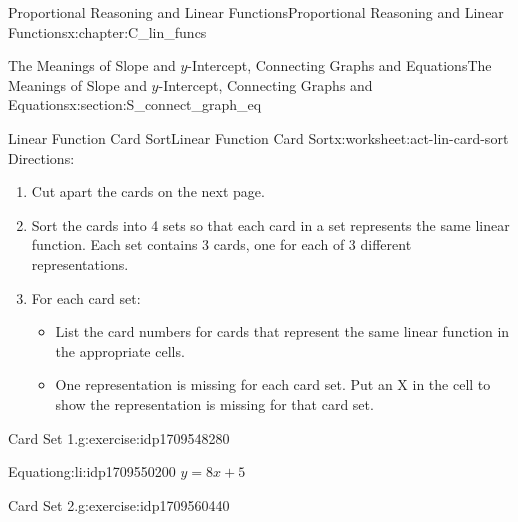 \documentclass[oneside,10pt,]{book}
\newlength{\fillinmaxwidth}
\newlength{\fillincontract}
\newlength{\fillinheight}
\newcommand{\fillintext}[1]{%
\setlength{\fillinmaxwidth}{#1em*\real{0.5}}%
\setlength{\fillincontract}{#1em*\real{0.5}*\real{0.2}}%
\setlength{\fillinheight}{\heightof{\strut}+1.2pt}%
\strut\nobreak\leaders\vbox{\hrule width 0.3pt height 0.3pt \vskip -1.2pt}\hskip 1\fillinmaxwidth minus \fillincontract\nobreak\strut%
}
\numberwithin{equation}{chapter}
\begin{document}
\begin{chapterptx}{Proportional Reasoning and Linear Functions}{}{Proportional Reasoning and Linear Functions}{}{}{x:chapter:C_lin_funcs}
\begin{sectionptx}{The Meanings of Slope and \(y\)-Intercept, Connecting Graphs and Equations}{}{The Meanings of Slope and \(y\)-Intercept, Connecting Graphs and Equations}{}{}{x:section:S_connect_graph_eq}
\restoregeometry
%
%
\typeout{************************************************}
\typeout{************************************************}
%
\begin{worksheet-subsection}{Linear Function Card Sort}{}{Linear Function Card Sort}{}{}{x:worksheet:act-lin-card-sort}
Directions:%
\begin{enumerate}[label=(\alph*)]
\item{}Cut apart the cards on the next page.%
\item{}Sort the cards into 4 sets so that each card in a set represents the same linear function. Each set contains 3 cards, one for each of 3 different representations.%
\item{}For each card set:%
\begin{itemize}[label=\textbullet]
\item{}List the card numbers for cards that represent the same linear function in the appropriate cells.%
\item{}One representation is missing for each card set. Put an X in the cell to show the representation is missing for that card set.%
\end{itemize}
%
\end{enumerate}
%
\begin{divisionexercise}{1}{Card Set 1.}{}{g:exercise:idp1709548280}%
%
\begin{descriptionlist}
\begin{dlimedium}{Equation}{g:li:idp1709550200}%
\(\displaystyle y = 8x + 5\)%
\end{dlimedium}%
%
%
%
\end{descriptionlist}
%
\end{divisionexercise}%
\begin{divisionexercise}{2}{Card Set 2.}{}{g:exercise:idp1709560440}%
%
\begin{descriptionlist}

\end{descriptionlist}
\end{divisionexercise}
\end{worksheet-subsection}
\end{sectionptx}
\end{chapterptx}
\end{document}
